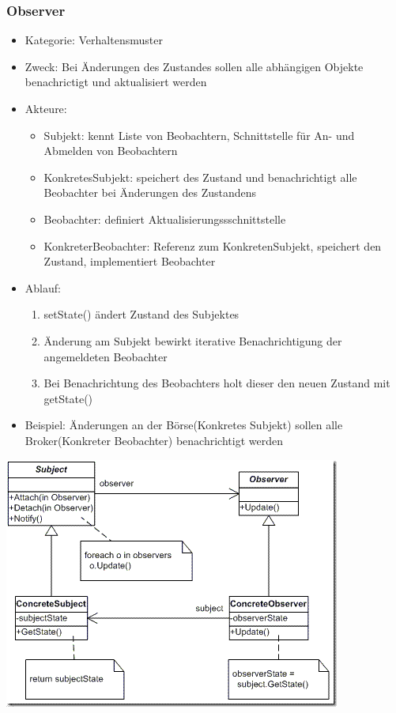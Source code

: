 \documentclass[11pt, fleqn, a4paper, leqno]{scrartcl} %
\begin{document}
		\subsubsection{Observer}
			\begin{itemize}
				\item Kategorie: Verhaltensmuster
				\item Zweck: Bei Änderungen des Zustandes sollen alle abhängigen Objekte benachrictigt und aktualisiert werden 
				\item Akteure:
					\begin{itemize}
						\item Subjekt: kennt Liste von Beobachtern, Schnittstelle für An- und Abmelden von Beobachtern
						\item KonkretesSubjekt: speichert des Zustand und benachrichtigt alle Beobachter bei Änderungen des Zustandens
						\item Beobachter: definiert Aktualisierungssschnittstelle
						\item KonkreterBeobachter: Referenz zum KonkretenSubjekt, speichert den Zustand, implementiert Beobachter
					\end{itemize}
				\item Ablauf:
					\begin{enumerate}
						\item  setState() ändert Zustand des Subjektes
						\item Änderung am Subjekt bewirkt iterative Benachrichtigung der angemeldeten Beobachter
						\item Bei Benachrichtung des Beobachters holt dieser den neuen Zustand mit getState()
					\end{enumerate}
				\item Beispiel: Änderungen an der Börse(Konkretes Subjekt) sollen alle Broker(Konkreter Beobachter) benachrichtigt werden
			\end{itemize}
			\includegraphics[scale=0.5]{images/observer.png}
		\newpage
\end{document}
